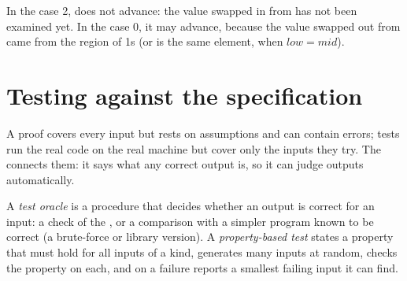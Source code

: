 \label{out:b1:program-correctness:flag}

\begin{omfigure}
\par{}
\end{omfigure}

In the case 2,  does not advance: the value swapped in from  has not been examined yet. In the
case 0, it may advance, because the value swapped out from  came from the region of 1s (or is the same
element, when $low = mid$).

\section{Testing against the specification}\label{sec:b1:program-correctness:testing}

A proof covers every input but rests on assumptions and can contain errors; tests run the real code on the real
machine but cover only the inputs they try. The  connects them: it says what any correct output is, so
it can judge outputs automatically.

\begin{definition}\label{def:b1:program-correctness:oracle}
A \emph{test oracle} is a procedure that decides whether an output is correct for an input: a
check of the , or a comparison with a simpler program known to be correct (a brute-force or library
version). A \emph{property-based test} states a property that must hold for all inputs of
a kind, generates many inputs at random, checks the property on each, and on a failure reports a smallest failing
input it can find.
\end{definition}

